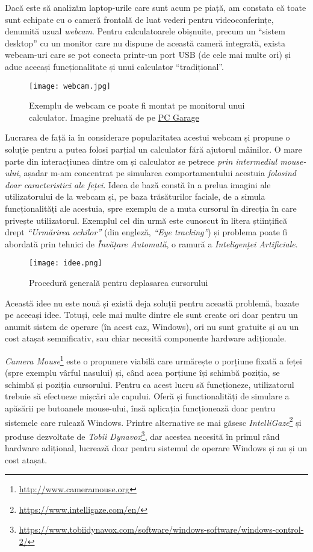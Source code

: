 Dacă este să analizăm laptop-urile care sunt acum pe piață, am constata că toate sunt echipate cu o cameră frontală de luat vederi pentru videoconferințe, denumită uzual \emph{webcam}.
Pentru calculatoarele obișnuite, precum un ``sistem desktop'' cu un monitor care nu dispune de această cameră integrată, exista webcam-uri care se pot conecta printr-un port USB (de cele mai multe ori) și aduc aceeași funcționalitate și unui calculator ``tradițional''.

\begin{figure}[h]
    \centering
    \texttt{[image: webcam.jpg]}
    \caption{Exemplu de webcam ce poate fi montat pe monitorul unui calculator. Imagine preluată de pe \href{https://www.pcgarage.ro/camere-web/logitech/streamcam-off-white/}{PC Garage}}
\end{figure}

Lucrarea de față ia în considerare popularitatea acestui webcam și propune o soluție pentru a putea folosi parțial un calculator fără ajutorul mâinilor.
O mare parte din interacțiunea dintre om și calculator se petrece \emph{prin intermediul mouse-ului}, așadar m-am concentrat pe simularea comportamentului acestuia \emph{folosind doar caracteristici ale feței}.
Ideea de bază constă în a prelua imagini ale utilizatorului de la webcam și, pe baza trăsăturilor faciale, de a simula funcționalități ale acestuia, spre exemplu de a muta cursorul în direcția în care privește utilizatorul.
Exemplul cel din urmă este cunoscut în litera științifică drept \emph{``Urmărirea ochilor''} (din engleză, \emph{``Eye tracking''}) și problema poate fi abordată prin tehnici de \emph{Învățare Automată}, o ramură a \emph{Inteligenței Artificiale}.

\begin{figure}[H]
    \centering
    \texttt{[image: idee.png]}
    \caption{Procedură generală pentru deplasarea cursorului}
\end{figure}

Această idee nu este nouă și există deja soluții pentru această problemă, bazate pe aceeași idee.
Totuși, cele mai multe dintre ele sunt create ori doar pentru un anumit sistem de operare (în acest caz, Windows), ori nu sunt gratuite și au un cost atașat semnificativ, sau chiar necesită componente hardware adiționale.

\emph{Camera Mouse}\footnote{\url{http://www.cameramouse.org}} este o propunere viabilă care urmărește o porțiune fixată a feței (spre exemplu vârful nasului) și, când acea porțiune își schimbă poziția, se schimbă și poziția cursorului.
Pentru ca acest lucru să funcționeze, utilizatorul trebuie să efectueze mișcări ale capului.
Oferă și functionalități de simulare a apăsării pe butoanele mouse-ului, însă aplicația funcționează doar pentru sistemele care rulează Windows.
Printre alternative se mai găsesc \emph{IntelliGaze}\footnote{\url{https://www.intelligaze.com/en/}} și produse dezvoltate de \emph{Tobii Dynavox}\footnote{\url{https://www.tobiidynavox.com/software/windows-software/windows-control-2/}}, dar acestea necesită în primul rând hardware adițional, lucrează doar pentru sistemul de operare Windows și au și un cost atașat.

